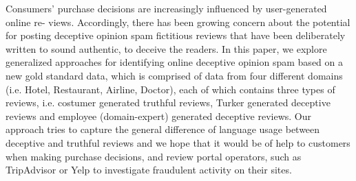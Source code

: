 Consumers' purchase decisions are increasingly influenced by user-generated online re- views. Accordingly, there has been growing concern about the potential for posting deceptive opinion spam fictitious reviews that have been deliberately written to sound authentic, to deceive the readers. In this paper, we explore generalized approaches for identifying online deceptive opinion spam based on a new gold standard data, which is comprised of data from four different domains (i.e. Hotel, Restaurant, Airline, Doctor), each of which contains three types of reviews, i.e. costumer generated truthful reviews, Turker generated deceptive reviews and employee (domain-expert) generated deceptive reviews. Our approach tries to capture the general difference of language usage between deceptive and truthful reviews and we hope that it would be of help to customers when making purchase decisions, and review portal operators, such as TripAdvisor or Yelp to investigate fraudulent activity on their sites.
